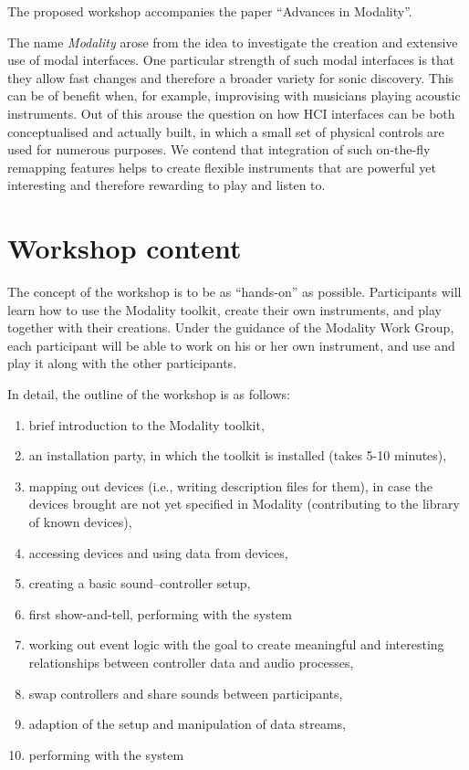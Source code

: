 \documentclass{article}
\begin{document}
The proposed workshop accompanies the paper ``Advances in Modality''.

The name \emph{Modality} arose from the idea to investigate the creation and extensive use of modal interfaces.
One particular strength of such modal interfaces is that they allow fast changes and therefore a broader variety for sonic discovery.
This can be of benefit when, for example, improvising with musicians playing acoustic instruments.
Out of this arouse the question on how HCI interfaces can be both conceptualised and actually built, in which a small set of physical controls are used for numerous purposes.
We contend that integration of such on-the-fly remapping features helps to create flexible instruments that are powerful yet interesting and therefore rewarding to play and listen to. 


\section{Workshop content}
\label{sec:workshop_content}

The concept of the workshop is to be as “hands-­on” as possible.
Participants will learn how to use the Modality toolkit, create their own instruments, and play together with their creations. 
Under the guidance of the Modality Work Group, each participant will be able to work on his or her own instrument, and use and play it along with the other participants.

In detail, the outline of the workshop is as follows:

\begin{enumerate}
	\item brief introduction to the Modality toolkit,
	\item an installation party, in which the toolkit is installed (takes 5-10 minutes),
	\item mapping out devices (i.e., writing description files for them), in case the devices brought are not yet specified in Modality (contributing to the library of known devices),
	\item accessing devices and using data from devices,
	\item creating a basic sound--controller setup,
	\item first show-and-tell, performing with the system
	\item working out event logic with the goal to create meaningful and interesting relationships between controller data and audio processes,
	\item swap controllers and share sounds between participants,
	\item adaption of the setup and manipulation of data streams,
	\item performing with the system
\end{enumerate}
\end{document}
